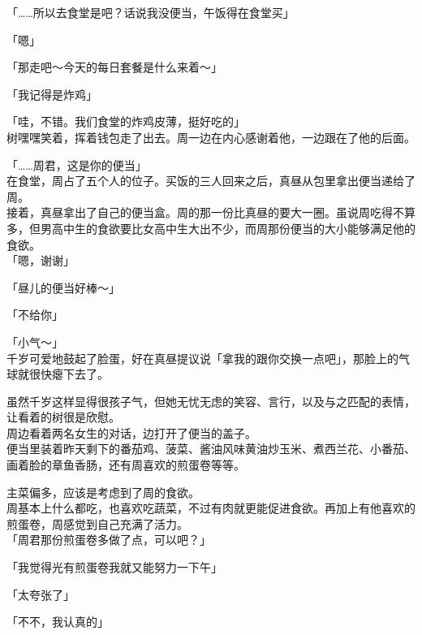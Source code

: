 「……所以去食堂是吧？话说我没便当，午饭得在食堂买」

「嗯」

「那走吧～今天的每日套餐是什么来着～」

「我记得是炸鸡」

「哇，不错。我们食堂的炸鸡皮薄，挺好吃的」\\

树嘿嘿笑着，挥着钱包走了出去。周一边在内心感谢着他，一边跟在了他的后面。\\

\vspace{2\baselineskip}

「……周君，这是你的便当」\\

在食堂，周占了五个人的位子。买饭的三人回来之后，真昼从包里拿出便当递给了周。\\

接着，真昼拿出了自己的便当盒。周的那一份比真昼的要大一圈。虽说周吃得不算多，但男高中生的食欲要比女高中生大出不少，而周那份便当的大小能够满足他的食欲。\\

「嗯，谢谢」

「昼儿的便当好棒～」

「不给你」

「小气～」\\

千岁可爱地鼓起了脸蛋，好在真昼提议说「拿我的跟你交换一点吧」，那脸上的气球就很快瘪下去了。

虽然千岁这样显得很孩子气，但她无忧无虑的笑容、言行，以及与之匹配的表情，让看着的树很是欣慰。\\

周边看着两名女生的对话，边打开了便当的盖子。\\

便当里装着昨天剩下的番茄鸡、菠菜、酱油风味黄油炒玉米、煮西兰花、小番茄、画着脸的章鱼香肠，还有周喜欢的煎蛋卷等等。

主菜偏多，应该是考虑到了周的食欲。\\

周基本上什么都吃，也喜欢吃蔬菜，不过有肉就更能促进食欲。再加上有他喜欢的煎蛋卷，周感觉到自己充满了活力。\\

「周君那份煎蛋卷多做了点，可以吧？」

「我觉得光有煎蛋卷我就又能努力一下午」

「太夸张了」

「不不，我认真的」\\


